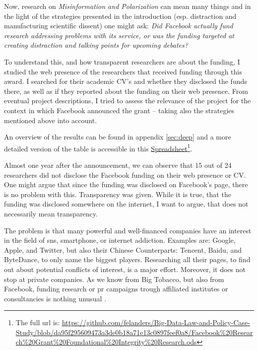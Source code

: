 Now, research on \textit{Misinformation and Polarization} can mean many things and in the light of the strategies presented in the introduction (esp. distraction and manufacturing scientific dissent) one might ask: \emph{Did Facebook actually fund research addressing problems with its service, or was the funding targeted at creating distraction and talking points for upcoming debates?}

To understand this, and how transparent researchers are about the funding, I studied the web presence of the researchers that received funding through this award. 
I searched for their academic CV's and whether they disclosed the funds there, as well as if they reported about the funding on their web presence.
From eventual project descriptions, I tried to assess the relevance of the project for the context in which Facebook announced the grant  -- taking also the strategies mentioned above into account.

An overview of the results can be found in appendix \ref{sec:deep} and a more detailed version of the table is accessible in this \href{https://github.com/felanders/Big-Data-Law-and-Policy-Case-Study/blob/da95f295609473a3de0b18a71e13c0897feef0a8/Facebook\%20Research\%20Grant\%20Foundational\%20Integrity\%20Research.ods}{Spreadsheet}\footnote{The full url is: \url{https://github.com/felanders/Big-Data-Law-and-Policy-Case-Study/blob/da95f295609473a3de0b18a71e13c0897feef0a8/Facebook\%20Research\%20Grant\%20Foundational\%20Integrity\%20Research.ods}}.

Almost one year after the announcement, we can observe that 15 out of 24 researchers did not disclose the Facebook funding on their web presence or CV.
One might argue that since the funding was disclosed on Facebook's page, there is no problem with this. Transparency was given.
While it is true, that the funding was disclosed somewhere on the internet, I want to argue, that does not necessarily mean transparency.

The problem is that many powerful and well-financed companies have an interest in the field of \gls{sns}, smartphone, or internet addiction. 
Examples are: Google, Apple, and Twitter, but also their Chinese Counterparts: Tencent, Baidu, and ByteDance, to only name the biggest players.
Researching all their pages, to find out about potential conflicts of interest, is a major effort.
Moreover, it does not stop at private companies.
As we know from Big Tobacco, but also from Facebook, funding research or \gls{pr} campaigns trough affiliated institutes or consultancies is nothing unusual \citep{oreskes_merchants_2010, frenkel_delay_2018}.

